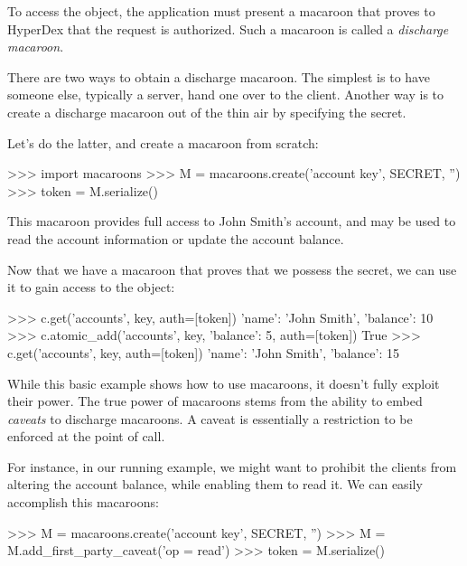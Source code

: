 To access the object, the application must present a macaroon that proves to
HyperDex that the request is authorized.  Such a macaroon is called a {\em discharge macaroon}. 

There are two ways to obtain a discharge macaroon. The simplest is to have
someone else, typically a server, hand one over to the client. 
Another way is to create a discharge macaroon out of the thin air by specifying the secret. 

Let's do the latter, and create a macaroon from scratch:

\begin{pythoncode}
>>> import macaroons
>>> M = macaroons.create('account key', SECRET, '')
>>> token = M.serialize()
\end{pythoncode}

This macaroon provides full access to John Smith's account, and may be used to
read the account information or update the account balance.  

Now that we have a macaroon that proves that we possess the secret, we can use
it to gain access to the object:

\begin{pythoncode}
>>> c.get('accounts', key, auth=[token])
{'name': 'John Smith', 'balance': 10}
>>> c.atomic_add('accounts', key, {'balance': 5}, auth=[token])
True
>>> c.get('accounts', key, auth=[token])
{'name': 'John Smith', 'balance': 15}
\end{pythoncode}

While this basic example shows how to use macaroons, it doesn't fully exploit
their power. The true power of macaroons stems
from the ability to embed {\em caveats} to discharge macaroons. A caveat is essentially
a restriction to be enforced at the point of call. 

For instance, in our running example, we might want to prohibit the clients
from altering the account balance, while enabling them to read it. We can
easily accomplish this macaroons:

\begin{pythoncode}
>>> M = macaroons.create('account key', SECRET, '')
>>> M = M.add_first_party_caveat('op = read')
>>> token = M.serialize()
\end{pythoncode}

